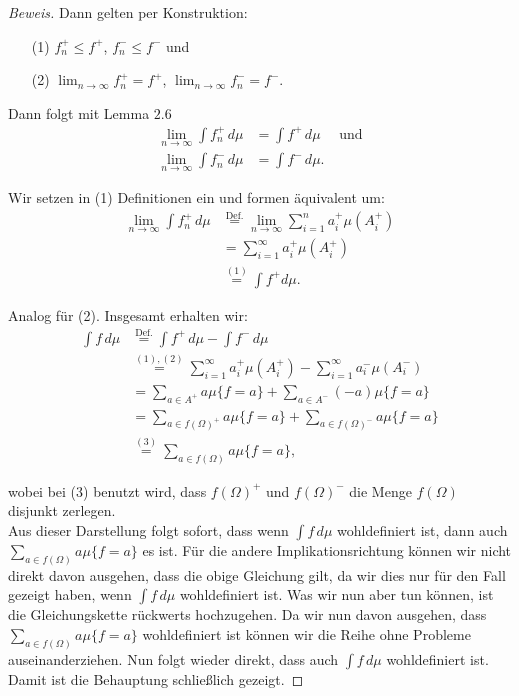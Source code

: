 \documentclass[10pt]{article}
\begin{document}
\begin{proof}[Beweis]
  Dann gelten per Konstruktion:
  \begin{itemize}
    \item[(1)] $f_n^+ \leq f^{+}$, $f_n^- \leq f^{-}$ \quad und
    \item[(2)] $\lim_{n\to\infty} f_n^{+} = f^{+}$, $\lim_{n\to\infty} f_n^{-} = f^{-}$.
  \end{itemize}

  Dann folgt mit Lemma $2.6$ 
  \begin{align}
    \lim_{n\to\infty} \int f_n^{+} \,d\mu &= \int f^{+} \,d\mu \quad \text{ und} \\
    \lim_{n\to\infty} \int f_n^{-} \,d\mu &= \int f^{-} \,d\mu. 
  \end{align}

  Wir setzen in (1) Definitionen ein und formen äquivalent um:
  \begin{align*}
    \lim_{n\to\infty} \int f_n^{+} \,d\mu &\overset{\text{Def.}}{=} \lim_{n\to\infty}\sum_{i=1}^{n} a_i^{+}\mu(A_i^+) \\
                                          &= \sum_{i=1}^{\infty} a_i^{+}\mu(A_i^+) \\
                                          &\overset{(1)}{=} \int f^+ d\mu .
  \end{align*}

  Analog für (2). Insgesamt erhalten wir:
  \begin{align*}
    \int f\,d\mu &\overset{\text{Def.}}{=} \int f^+\,d\mu - \int f^-\,d\mu \\
                 &\overset{(1),(2)}{=}  \sum_{i=1}^{\infty} a_i^{+}\mu(A_i^+) - \sum_{i=1}^{\infty} a_i^{-}\mu(A_i^-) \\
                 &= \sum_{a\in A^+} a\mu\{f = a\} + \sum_{a\in A^-} (-a)\mu\{f = a\} \\
                 &= \sum_{a\in f(\Omega)^+} a\mu\{f = a\} + \sum_{a\in f(\Omega)^-} a\mu\{f = a\} \\
                 &\overset{(3)}{=} \sum_{a\in f(\Omega)} a \mu\{f = a\},
  \end{align*}

  wobei bei (3) benutzt wird, dass $f(\Omega)^+$ und $f(\Omega)^-$ die Menge $f(\Omega)$ disjunkt zerlegen.  \\
  Aus dieser Darstellung folgt sofort, dass wenn $\int f\,d\mu$ wohldefiniert ist, dann auch
  $\sum_{a\in f(\Omega)} a \mu\{f = a\}$ es ist. Für die andere Implikationsrichtung können wir 
  nicht direkt davon ausgehen, dass die obige Gleichung gilt, da wir dies nur für den Fall gezeigt haben, 
  wenn $\int f\,d\mu$ wohldefiniert ist. Was wir nun aber tun können, ist die Gleichungskette rückwerts 
  hochzugehen. Da wir nun davon ausgehen, dass $\sum_{a\in f(\Omega)} a \mu\{f = a\}$ wohldefiniert ist 
  können wir die Reihe ohne Probleme auseinanderziehen. Nun folgt wieder direkt, dass auch $\int f\,d\mu$ wohldefiniert ist. 
  Damit ist die Behauptung schließlich gezeigt.
\end{proof}
\end{document}
